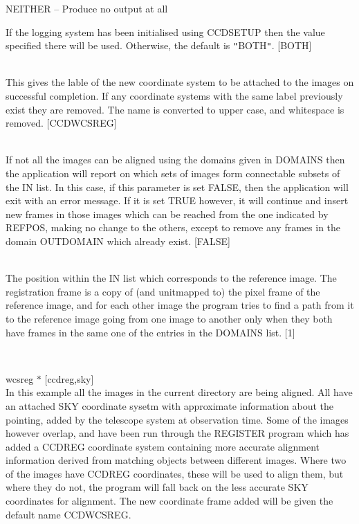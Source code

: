 \documentclass[twoside,11pt]{article}
\newcommand{\htmlref}[2]{#1}
\renewcommand{\_}{\texttt{\symbol{95}}}
\newcommand{\qt}[1]{{\tt "}#1{\tt "}}
\newcommand{\xroutine}[1]{\htmlref{{\sc #1}}{#1}}
\newcommand{\sstexamples}[1]{
   \item[Examples:] \mbox{} \\
   \vspace{-3.5ex}
   \begin{description}
      #1
   \end{description}
}
\newcommand{\sstsubsection}[1]{ \item[{#1}] \mbox{} \\}
\newcommand{\sstexamplesubsection}[2]{\sloppy \item{\ssttt #1} \mbox{} \\ #2 }
\newcommand{\sstitem}{\item}
\newcommand{\sstexamples}[1]{
      \item[Examples:] \\
      \begin{description}
         #1
      \end{description}
      \\
   }
\newcommand{\sstsubsection}[1]{\item[{#1}]}
\newcommand{\sstexamplesubsection}[2]{\item[{\ssttt #1}] #2}
\newcommand{\sstitem}{\item}
\begin{document}
{{{{            \sstitem
               NEITHER   -- Produce no output at all

         }
         If the logging system has been initialised using \xroutine{CCDSETUP}
         then the value specified there will be used. Otherwise, the
         default is \qt{BOTH}.
         [BOTH]
      }
      \sstsubsection{
         OUTDOMAIN = LITERAL (Read)
      } {
         This gives the lable of the new coordinate system to be attached
         to the images on successful
         completion.  If any coordinate systems with the same label previously exist
         they are removed.  The name is converted
         to upper case, and whitespace is removed.
         [CCD\_WCSREG]
      }
      \sstsubsection{
         OVERRIDE = \_LOGICAL (Read)
      } {
         If not all the images can be aligned using the domains given in
         DOMAINS then the application will report on which sets of images
         form connectable subsets of the IN list.  In this case, if this
         parameter is set FALSE, then the application will exit with an
         error message.  If it is set TRUE however, it will continue and
         insert new frames in those images which can be reached from the
         one indicated by REFPOS, making no change to the others, except
         to remove any frames in the domain OUTDOMAIN which already exist.
         [FALSE]
      }
      \sstsubsection{ 
         REFPOS = \_INTEGER (Read)
      } {
         The position within the IN list which corresponds to the
         reference image.  The registration frame is a copy of (and
         unitmapped to) the pixel frame of the reference image,
         and for each other image the program tries to find a path from
         it to the reference image going from one image to another only
         when they both have frames in the same one of the entries in
         the DOMAINS list.
         [1]
      }
   }
   \sstexamples{
      \sstexamplesubsection{
         wcsreg $*$ [ccd\_reg,sky]
      }{
         In this example all the images in the current directory are
         being aligned.  All have an attached SKY coordinate sysetm
         with approximate information about the pointing, added by the
         telescope system at observation time.  Some of the images
         however overlap, and have been run through the REGISTER
         program which has added a CCD\_REG coordinate system
         containing more accurate alignment information derived from
         matching objects between different images.  Where two of the
         images have CCD\_REG coordinates, these will be used to align
         them, but where they do not, the program will fall back on
         the less accurate SKY coordinates for alignment.  The new
         coordinate frame added will be given the default name
         CCD\_WCSREG.

}}}
\end{document}
